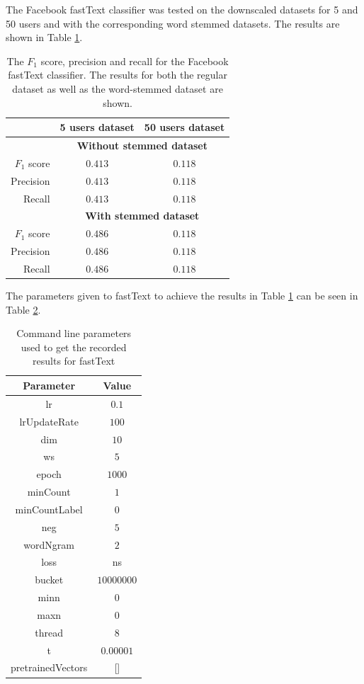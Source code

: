 The Facebook fastText classifier was tested on the downscaled datasets for 5 and 50 users and with the corresponding word stemmed datasets. The results are shown in Table \ref{table:facebook_results}.
\begin{table}[h!]
    \centering
    \begin{tabular}{ r | c | c }
    & \textbf{5 users dataset} & \textbf{50 users dataset} \\ \hline    \hline
    & \multicolumn{2}{c}{\textbf{Without stemmed dataset}} \\ \hline \hline
    $F_1$ score & $0.413$ & $0.118$ \\ \hline
    Precision & $0.413$ & $0.118$ \\ \hline
    Recall & $0.413$ & $0.118$ \\ \hline \hline
    & \multicolumn{2}{c}{\textbf{With stemmed dataset}} \\ \hline \hline
    $F_1$ score & $0.486$ & $0.118$ \\ \hline
    Precision & $0.486$ & $0.118$ \\ \hline
    Recall & $0.486$ & $0.118$ \\ \hline
    \end{tabular}
    \caption{The $F_1$ score, precision and recall for the Facebook fastText classifier. The results for both the regular dataset as well as the word-stemmed dataset are shown.}
    \label{table:facebook_results}
\end{table}

The parameters given to fastText to achieve the results in Table \ref{table:facebook_results} can be seen in Table \ref{table:fasttext-arg}.

\begin{table}[h!]
    \centering
    \begin{tabular}{ c | c }
    \textbf{Parameter} & \textbf{Value} \\ \hline \hline
    lr & $0.1$ \\ \hline
    lrUpdateRate & $100$ \\ \hline
    dim & $10$ \\ \hline
    ws & $5$ \\ \hline
    epoch & $1000$ \\ \hline
    minCount & $1$ \\ \hline
    minCountLabel & $0$ \\ \hline
    neg & $5$ \\ \hline
    wordNgram & $2$ \\ \hline
    loss & ns \\ \hline
    bucket & $10 000 000$ \\ \hline
    minn & $0$ \\ \hline
    maxn & $0$ \\ \hline
    thread & $8$ \\ \hline
    t & $0.00001$ \\ \hline
    pretrainedVectors & [] \\ \hline
    \end{tabular}
    \caption{Command line parameters used to get the recorded results for fastText}
    \label{table:fasttext-arg}
\end{table}

